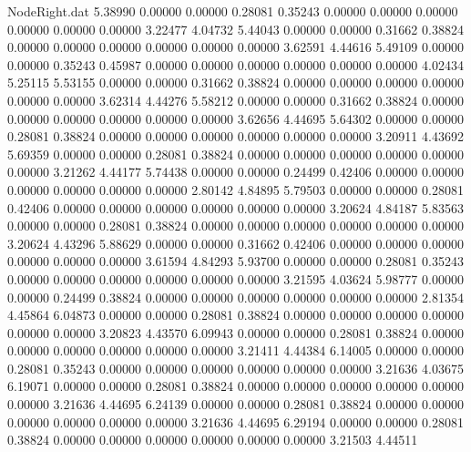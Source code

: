\begin{filecontents}{NodeRight.dat}
   5.38990    0.00000    0.00000     0.28081    0.35243    0.00000    0.00000    0.00000    0.00000    0.00000    0.00000    3.22477    4.04732
   5.44043    0.00000    0.00000     0.31662    0.38824    0.00000    0.00000    0.00000    0.00000    0.00000    0.00000    3.62591    4.44616
   5.49109    0.00000    0.00000     0.35243    0.45987    0.00000    0.00000    0.00000    0.00000    0.00000    0.00000    4.02434    5.25115
   5.53155    0.00000    0.00000     0.31662    0.38824    0.00000    0.00000    0.00000    0.00000    0.00000    0.00000    3.62314    4.44276
   5.58212    0.00000    0.00000     0.31662    0.38824    0.00000    0.00000    0.00000    0.00000    0.00000    0.00000    3.62656    4.44695
   5.64302    0.00000    0.00000     0.28081    0.38824    0.00000    0.00000    0.00000    0.00000    0.00000    0.00000    3.20911    4.43692
   5.69359    0.00000    0.00000     0.28081    0.38824    0.00000    0.00000    0.00000    0.00000    0.00000    0.00000    3.21262    4.44177
   5.74438    0.00000    0.00000     0.24499    0.42406    0.00000    0.00000    0.00000    0.00000    0.00000    0.00000    2.80142    4.84895
   5.79503    0.00000    0.00000     0.28081    0.42406    0.00000    0.00000    0.00000    0.00000    0.00000    0.00000    3.20624    4.84187
   5.83563    0.00000    0.00000     0.28081    0.38824    0.00000    0.00000    0.00000    0.00000    0.00000    0.00000    3.20624    4.43296
   5.88629    0.00000    0.00000     0.31662    0.42406    0.00000    0.00000    0.00000    0.00000    0.00000    0.00000    3.61594    4.84293
   5.93700    0.00000    0.00000     0.28081    0.35243    0.00000    0.00000    0.00000    0.00000    0.00000    0.00000    3.21595    4.03624
   5.98777    0.00000    0.00000     0.24499    0.38824    0.00000    0.00000    0.00000    0.00000    0.00000    0.00000    2.81354    4.45864
   6.04873    0.00000    0.00000     0.28081    0.38824    0.00000    0.00000    0.00000    0.00000    0.00000    0.00000    3.20823    4.43570
   6.09943    0.00000    0.00000     0.28081    0.38824    0.00000    0.00000    0.00000    0.00000    0.00000    0.00000    3.21411    4.44384
   6.14005    0.00000    0.00000     0.28081    0.35243    0.00000    0.00000    0.00000    0.00000    0.00000    0.00000    3.21636    4.03675
   6.19071    0.00000    0.00000     0.28081    0.38824    0.00000    0.00000    0.00000    0.00000    0.00000    0.00000    3.21636    4.44695
   6.24139    0.00000    0.00000     0.28081    0.38824    0.00000    0.00000    0.00000    0.00000    0.00000    0.00000    3.21636    4.44695
   6.29194    0.00000    0.00000     0.28081    0.38824    0.00000    0.00000    0.00000    0.00000    0.00000    0.00000    3.21503    4.44511

\end{filecontents}
